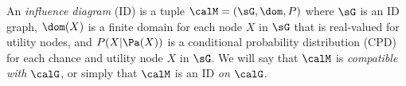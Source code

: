 






    




\begin{definition}%
    \label{def:cim}
    An \emph{influence diagram} (ID) is  a tuple $\calM = (\sG, \dom, P)$ where $\sG$ is an ID graph, $\dom(X)$ is a finite domain for each node $X$ in $\sG$ that is real-valued for utility nodes, and $P( X | \Pa(X))$ is a conditional probability distribution (CPD) for each chance and utility node $X$ in $\sG$.
    We will say that $\calM$ is \emph{compatible with} $\calG$, or simply that $\calM$ is an ID \emph{on} $\calG$.~
\end{definition}



    
        
        



